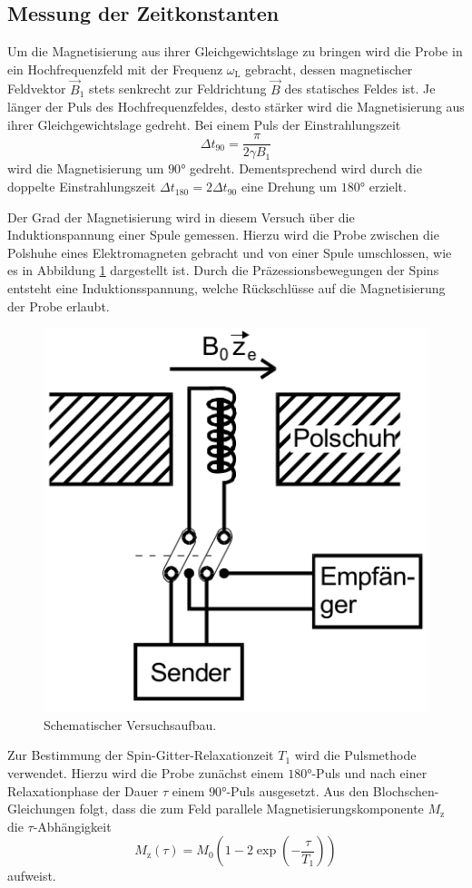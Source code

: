 \subsection{Messung der Zeitkonstanten}
Um die Magnetisierung aus ihrer Gleichgewichtslage zu bringen wird die Probe in ein Hochfrequenzfeld mit der Frequenz $\omega_\text{L}$ gebracht, dessen magnetischer Feldvektor $\vec{B}_1$ stets senkrecht zur Feldrichtung $\vec{B}$ des statisches Feldes ist.
Je länger der Puls des Hochfrequenzfeldes, desto stärker wird die Magnetisierung aus ihrer Gleichgewichtslage gedreht.
Bei einem Puls der Einstrahlungszeit 
\begin{equation}
    \Delta t_{90}=\frac{\pi}{2\gamma B_1} 
\end{equation}
wird die Magnetisierung um $90°$ gedreht.
Dementsprechend wird durch die doppelte Einstrahlungszeit $\Delta t_{180}=2 \Delta t_{90}$ eine Drehung um $180°$ erzielt.

Der Grad der Magnetisierung wird in diesem Versuch über die Induktionspannung einer Spule gemessen.
Hierzu wird die Probe zwischen die Polshuhe eines Elektromagneten gebracht und von einer Spule umschlossen, wie es in Abbildung \ref{fig:fig1} dargestellt ist.
Durch die Präzessionsbewegungen der Spins entsteht eine Induktionsspannung, welche Rückschlüsse auf die Magnetisierung der Probe erlaubt.

\begin{figure}[H]
\centering
\includegraphics[width=0.4\linewidth]{figs/Aufbau}
\caption{Schematischer Versuchsaufbau. \cite{Finke}}
\label{fig:fig1}
\end{figure}

Zur Bestimmung der Spin-Gitter-Relaxationzeit $T_1$ wird die Pulsmethode verwendet.
Hierzu wird die Probe zunächst einem $180°$-Puls und nach einer Relaxationphase der Dauer $\tau$ einem $90°$-Puls ausgesetzt.
Aus den Blochschen-Gleichungen folgt, dass die zum Feld parallele Magnetisierungskomponente $M_\text{z}$ die $\tau$-Abhängigkeit
\begin{equation}
    M_\text{z}(\tau)=M_0\left(1-2\exp(-\frac{\tau}{T_1})\right)
    \label{eq:t1}
\end{equation}
aufweist.

